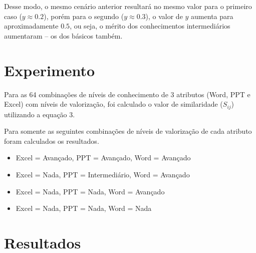 \documentclass[]{article}
\begin{document}
	Desse modo, o mesmo cenário anterior resultará no mesmo valor para o primeiro caso ($y \approx 0.2$), porém para o segundo ($y \approx 0.3$), o valor de $y$ aumenta para aproximadamente $0.5$, ou seja, o mérito dos conhecimentos intermediários aumentaram -- os dos básicos também.
	
	\section{Experimento}
	
	Para as 64 combinações de níveis de conhecimento de 3 atributos (Word, PPT e Excel) com níveis de valorização, foi calculado o valor de similaridade ($S_{ij}$) utilizando a equação 3.
	
	Para somente as seguintes combinações de níveis de valorização de cada atributo foram calculados os resultados.
	
	\begin{itemize}
		\item Excel = Avançado, PPT = Avançado, Word = Avançado
		\item Excel = Nada, PPT = Intermediário, Word = Avançado
		\item Excel = Nada, PPT = Nada, Word = Avançado
		\item Excel = Nada, PPT = Nada, Word = Nada
	\end{itemize}
	
	\section{Resultados}
	
\end{document}
